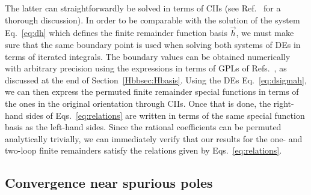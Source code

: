 \documentclass[main.tex]{subfiles}
\begin{document}
The latter can straightforwardly be solved in terms of CIIs (see Ref.~\cite{Badger:2021nhg} for a thorough discussion). In order to be comparable with the solution of the system Eq.~\ref{eq:dh} which defines the finite remainder function basis $\vec{h}$, we must make sure that the same boundary point is used when solving both systems of DEs in terms of iterated integrals. The boundary values can be obtained numerically with arbitrary precision using the expressions in terms of GPLs of Refs.~\cite{Papadopoulos:2015jft,Syrrakos:2020kba,Canko:2020ylt}, as discussed at the end of Section~\ref{Hbbsec:Hbasis}. Using the DEs Eq.~\ref{eq:dsigmah}, we can then express the permuted finite remainder special functions in terms of the ones in the original orientation through CIIs. Once that is done, the right-hand sides of Eqs.~\ref{eq:relations} are written in terms of the same special function basis as the left-hand sides. Since the rational coefficients can be permuted analytically trivially, we can immediately verify that our results for the one- and two-loop finite remainders satisfy the relations given by Eqs.~\ref{eq:relations}.




\subsection{Convergence near spurious poles}
\end{document}
